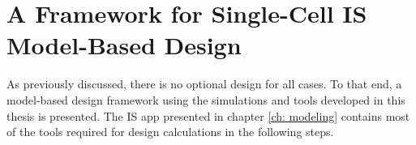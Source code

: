 

\section[IS Model-Based Design Framework]{A Framework for Single-Cell IS Model-Based Design}

\par As previously discussed, there is no optional design for all cases. To that end, a model-based design framework using the simulations and tools developed in this thesis is presented. The IS app presented in chapter \ref{ch: modeling} contains most of the tools required for design calculations in the following steps.

